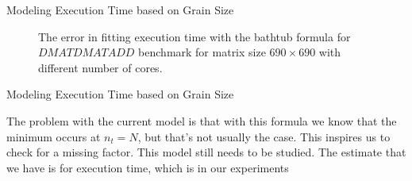 \documentclass[10pt]{beamer}
\begin{document}
\begin{frame}{Modeling Execution Time based on Grain Size}
	\begin{outline}	
\begin{figure}[H]
	\caption{The error in fitting execution time with the bathtub formula for $DMATDMATADD$ benchmark for matrix size $690\times690$ with different number of cores.}	
	\label{fig25}
\end{figure}
\end{outline}
\end{frame}

\begin{frame}{Modeling Execution Time based on Grain Size}
	\begin{outline}	
The problem with the current model is that with this formula we know that the minimum occurs at $n_t=N$, but that's not usually the case. This inspires us to check for a missing factor. 
This model still needs to be studied. The estimate that we have is for execution time, which is in our experiments 
\end{outline}
\end{frame}


\end{document}
